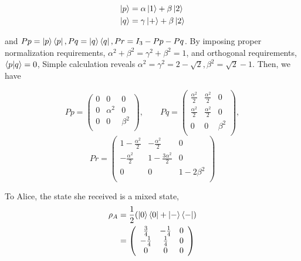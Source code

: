 \documentclass[%
 reprint,
superscriptaddress,
 amsmath,amssymb,
 aps,
]{revtex4-2}
\begin{document}
\begin{equation}
\begin{split}
    \ket{p}&=\alpha\ket{1}+\beta\ket{2}\\
    \ket{q}&=\gamma\ket{+}+\beta\ket{2}\\
\end{split}
\end{equation}

and $Pp=\ket{p}\bra{p}, Pq=\ket{q}\bra{q}, Pr=I_3-Pp-Pq$. By imposing proper normalization requirements, $\alpha^2+\beta^2=\gamma^2+\beta^2=1$, and orthogonal requirements, $\bra{p}\ket{q}=0$, Simple calculation reveals $\alpha^2=\gamma^2=2-\sqrt{2}, \beta^2=\sqrt{2}-1$. Then, we have

\begin{equation}
    Pp=\left(
\begin{array}{ccc}
 0 & 0 & 0 \\
 0 & \alpha^2 & 0 \\
 0 & 0 & \beta^2 \\
\end{array}
\right), \qquad
Pq=\left(
\begin{array}{ccc}
 \frac{\alpha^2}{2} & \frac{\alpha^2}{2}
   & 0 \\
 \frac{\alpha^2}{2} & \frac{\alpha^2}{2}
   & 0 \\
 0 & 0 & \beta^2 \\
\end{array}
\right),
\end{equation}
\begin{equation}
Pr=\left(
\begin{array}{ccc}
 1-\frac{\alpha^2}{2} &
   -\frac{\alpha^2}{2} & 0 \\
 -\frac{\alpha^2}{2} & 1-\frac{3
   \alpha^2}{2} & 0 \\
 0 & 0 & 1-2 \beta^2 \\
\end{array}
\right)
\end{equation}

To Alice, the state she received is a mixed state,
\begin{equation}
\begin{split}
    \rho_A &= \frac{1}{2}(\ket{0}\bra{0}+\ket{-}\bra{-})\\
    &=\left(
\begin{array}{ccc}
 \frac{3}{4} & -\frac{1}{4} &
   0 \\
 -\frac{1}{4} & \frac{1}{4} &
   0 \\
 0 & 0 & 0 \\
\end{array}
\right)
\end{split}
\end{equation}
\end{document}
